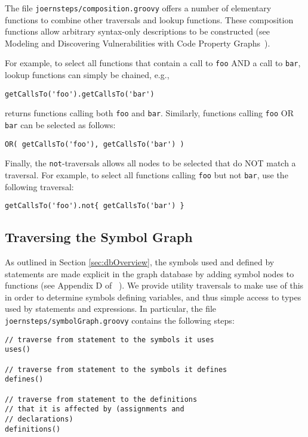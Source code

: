 \documentclass[a4paper]{article}
\newcommand{\code}[1]{\texttt{\small #1}}
\begin{document}
The file \code{joernsteps/composition.groovy} offers a number of
elementary functions to combine other traversals and lookup
functions. These composition functions allow arbitrary syntax-only
descriptions to be constructed (see Modeling and Discovering
Vulnerabilities with Code Property Graphs~\citep{YamGolArpRie14}).

For example, to select all functions that contain a call to \code{foo}
AND a call to \code{bar}, lookup functions can simply be chained,
e.g.,
\begin{verbatim}
getCallsTo('foo').getCallsTo('bar')
\end{verbatim}
returns functions calling both \code{foo} and \code{bar}. Similarly,
functions calling \code{foo} OR \code{bar} can be selected as follows:
\begin{verbatim}
OR( getCallsTo('foo'), getCallsTo('bar') )
\end{verbatim}

Finally, the \code{not}-traversals allows all nodes to be selected
that do NOT match a traversal. For example, to select all functions
calling \code{foo} but not \code{bar}, use the following traversal:
\begin{verbatim}
getCallsTo('foo').not{ getCallsTo('bar') }
\end{verbatim}

\subsection{Traversing the Symbol Graph}
\label{sec:symbolGraph}

As outlined in Section \ref{sec:dbOverview}, the symbols used and
defined by statements are made explicit in the graph database by
adding symbol nodes to functions (see Appendix D of
~\citep{YamGolArpRie14}). We provide utility traversals to make use of
this in order to determine symbols defining variables, and thus simple
access to types used by statements and expressions. In particular, the
file \code{joernsteps/symbolGraph.groovy} contains the following
steps:

\begin{verbatim}
// traverse from statement to the symbols it uses
uses()

// traverse from statement to the symbols it defines
defines()

// traverse from statement to the definitions
// that it is affected by (assignments and
// declarations)
definitions()
\end{verbatim}
\end{document}
